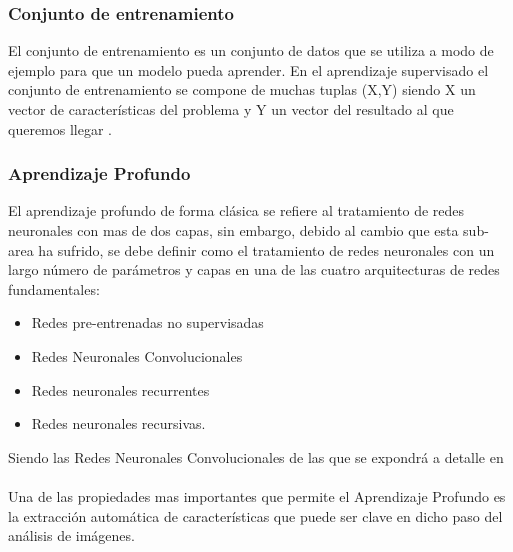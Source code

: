    \subsubsection{Conjunto de entrenamiento}
    El conjunto de entrenamiento es un conjunto de datos que se utiliza a modo de ejemplo para que un modelo pueda aprender. En el aprendizaje supervisado el conjunto de entrenamiento se compone de muchas tuplas (X,Y) siendo X un vector de características del problema y Y un vector del resultado al que queremos llegar \cite{deeplearningbook}.
    
    
    \subsubsection{Aprendizaje Profundo}
        El aprendizaje profundo de forma clásica se refiere al tratamiento de redes neuronales con mas de dos capas, sin embargo, debido al cambio que esta sub-area ha sufrido, se debe definir como el tratamiento de redes neuronales con un largo número de parámetros y capas en una de las cuatro arquitecturas de redes fundamentales:
        \begin{itemize}
            \item Redes pre-entrenadas no supervisadas
            \item Redes Neuronales Convolucionales
            \item Redes neuronales recurrentes
            \item Redes neuronales recursivas.
        \end{itemize}
    
    Siendo las Redes Neuronales Convolucionales de las que se expondrá a detalle en  \\%
    \\Una de las propiedades mas importantes que permite el Aprendizaje Profundo es la extracción automática de características que puede ser clave en dicho paso del análisis de imágenes.
    
